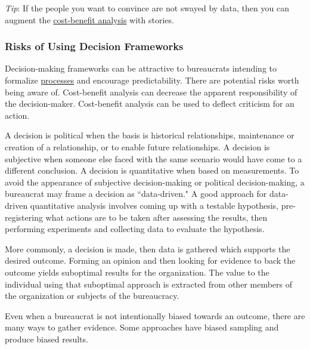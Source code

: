 \textit{Tip}: If the people you want to convince are not swayed by data, then you can augment the \href{https://en.wikipedia.org/wiki/Cost\%E2\%80\%93benefit_analysis}{cost-benefit analysis} with stories. 

\subsubsection{Risks of Using Decision Frameworks}

Decision-making frameworks can be attractive to bureaucrats intending to formalize 
\hyperref[sec:process]{processes} 
and encourage predictability. There are potential risks worth being aware of.  Cost-benefit analysis can decrease the apparent responsibility of the decision-maker. Cost-benefit analysis can be used to deflect criticism for an action. 

A decision is political when the basis is historical relationships, maintenance or creation of a relationship, or to enable future relationships. A decision is subjective when someone else faced with the same scenario would have come to a different conclusion.
A decision is quantitative when based on measurements. To avoid the appearance of subjective decision-making or political decision-making, a bureaucrat may frame a decision as ``data-driven." 
A good approach for data-driven quantitative analysis involves coming up with a testable hypothesis, pre-registering what actions are to be taken after assessing the results, then performing experiments and collecting data to evaluate the hypothesis. 

More commonly, a decision is made, then data is gathered which supports the desired outcome. Forming an opinion and then looking for evidence to back the outcome yields suboptimal results for the organization. The value to the individual using that suboptimal approach is extracted from other members of the organization or subjects of the bureaucracy. 

Even when a bureaucrat is not intentionally biased towards an outcome, there are many ways to gather evidence. Some approaches have biased sampling and produce biased results.

